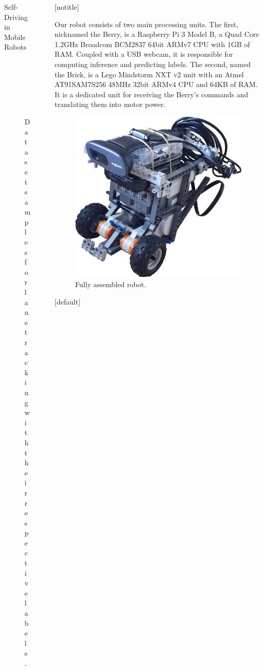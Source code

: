 \documentclass[final,hyperref={pdfpagelabels=false},notheorems]{beamer}
\newcommand{\shrink}{-15pt}
\theoremstyle{thesisstyle}
\begin{document}
\begin{frame}[t]
\begin{columns}[t]
\begin{column}{.5225\textwidth}
\begin{block}{Self-Driving in Mobile Robots}
\begin{figure}
\begin{subfigure}{0.3\linewidth}
          \captionsetup{justification=centering}
          \caption*{RIGHT}
        \end{subfigure}
        \caption{Dataset samples for lane tracking with their respective labels.}
      \end{figure}
    \end{block}

  \end{column}


  \begin{column}{.02\textwidth}\end{column} %

  \begin{column}{.5225\textwidth}

    \vspace{\shrink}
    [notitle]
    \begin{block}{}
      Our robot consists of two main processing units. The first, nicknamed the Berry, is a
      Raspberry Pi 3 Model B, a Quad Core 1.2GHz Broadcom BCM2837 64bit ARMv7 CPU with 1GB of RAM.
      Coupled with a USB webcam, it is responsible for computing inference and predicting labels.
      The second, named the Brick, is a Lego Mindstorm NXT v2 unit with an Atmel AT91SAM7S256 48MHz
      32bit ARMv4 CPU and 64KB of RAM. It is a dedicated unit for receiving the Berry's commands and
      translating them into motor power.

      \begin{figure}
        \centering\includegraphics{imgs/robot.png}
        \caption{Fully assembled robot.}
      \end{figure}
    \end{block}
    [default]


\end{column}
\end{columns}
\end{frame}
\end{document}
